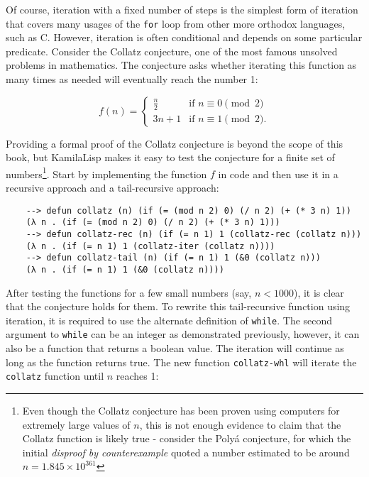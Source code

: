 Of course, iteration with a fixed number of steps is the simplest form of iteration that covers many usages of the \verb|for| loop from other more orthodox languages, such as C. However, iteration is often conditional and depends on some particular predicate. Consider the Collatz conjecture, one of the most famous unsolved problems in mathematics. The conjecture asks whether iterating this function as many times as needed will eventually reach the number 1:

\begin{equation*}
    f(n)={\begin{cases}{\frac {n}{2}}&{\text{if }}n\equiv 0{\pmod {2}}\\[4px]3n+1&{\text{if }}n\equiv 1{\pmod {2}}.\end{cases}}
\end{equation*}

Providing a formal proof of the Collatz conjecture is beyond the scope of this book, but KamilaLisp makes it easy to test the conjecture for a finite set of numbers\footnote{Even though the Collatz conjecture has been proven using computers for extremely large values of $n$, this is not enough evidence to claim that the Collatz function is likely true - consider the Polyá conjecture, for which the initial \textit{disproof by counterexample} quoted a number estimated to be around $n = 1.845 \times 10^{361}$}. Start by implementing the function $f$ in code and then use it in a recursive approach and a tail-recursive approach:

\begin{Verbatim}
    --> defun collatz (n) (if (= (mod n 2) 0) (/ n 2) (+ (* 3 n) 1))
    (λ n . (if (= (mod n 2) 0) (/ n 2) (+ (* 3 n) 1)))
    --> defun collatz-rec (n) (if (= n 1) 1 (collatz-rec (collatz n)))
    (λ n . (if (= n 1) 1 (collatz-iter (collatz n))))
    --> defun collatz-tail (n) (if (= n 1) 1 (&0 (collatz n)))
    (λ n . (if (= n 1) 1 (&0 (collatz n))))
\end{Verbatim}

After testing the functions for a few small numbers (say, $n < 1000$), it is clear that the conjecture holds for them. To rewrite this tail-recursive function using iteration, it is required to use the alternate definition of \verb|while|. The second argument to \verb|while| can be an integer as demonstrated previously, however, it can also be a function that returns a boolean value. The iteration will continue as long as the function returns true. The new function \verb|collatz-whl| will iterate the \verb|collatz| function until $n$ reaches 1:

